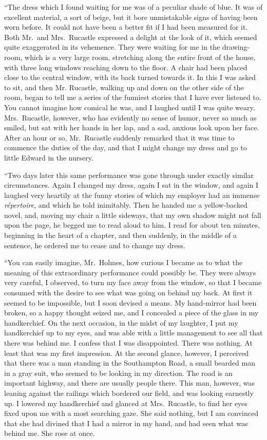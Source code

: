 “The dress which I found waiting for me was of a peculiar
shade of blue. It was of excellent material, a sort of beige,
but it bore unmistakable signs of having been worn before.
It could not have been a better fit if I had been measured for
it. Both Mr.~and Mrs.~Rucastle expressed a delight at the
look of it, which seemed quite exaggerated in its vehemence.
They were waiting for me in the drawing-room, which is a
very large room, stretching along the entire front of the house,
with three long windows reaching down to the floor. A chair
had been placed close to the central window, with its back
turned towards it. In this I was asked to sit, and then Mr.
Rucastle, walking up and down on the other side of the room,
began to tell me a series of the funniest stories that I have
ever listened to. You cannot imagine how comical he was,
and I laughed until I was quite weary. Mrs.~Rucastle, however,
who has evidently no sense of humor, never so much as
smiled, but sat with her hands in her lap, and a sad, anxious
look upon her face. After an hour or so, Mr.~Rucastle suddenly
remarked that it was time to commence the duties of
the day, and that I might change my dress and go to little
Edward in the nursery.

“Two days later this same performance was gone through
under exactly similar circumstances. Again I changed my
dress, again I sat in the window, and again I laughed very
heartily at the funny stories of which my employer had an
immense \textit{répertoire}, and which he told inimitably. Then he
handed me a yellow-backed novel, and, moving my chair a little
sideways, that my own shadow might not fall upon the page,
he begged me to read aloud to him. I read for about ten
minutes, beginning in the heart of a chapter, and then suddenly,
in the middle of a sentence, he ordered me to cease
and to change my dress.

“You can easily imagine, Mr.~Holmes, how curious I became
as to what the meaning of this extraordinary performance
could possibly be. They were always very careful, I
observed, to turn my face away from the window, so that I
became consumed with the desire to see what was going on
behind my back. At first it seemed to be impossible, but I
soon devised a means. My hand-mirror had been broken, so a
happy thought seized me, and I concealed a piece of the glass
in my handkerchief. On the next occasion, in the midst of
my laughter, I put my handkerchief up to my eyes, and was
able with a little management to see all that there was behind
me. I confess that I was disappointed. There was
nothing. At least that was my first impression. At the second
glance, however, I perceived that there was a man standing
in the Southampton Road, a small bearded man in a gray
suit, who seemed to be looking in my direction. The road is
an important highway, and there are usually people there.
This man, however, was leaning against the railings which
bordered our field, and was looking earnestly up. I lowered
my handkerchief and glanced at Mrs.~Rucastle, to find her
eyes fixed upon me with a most searching gaze. She said
nothing, but I am convinced that she had divined that I had
a mirror in my hand, and had seen what was behind me. She
rose at once.


